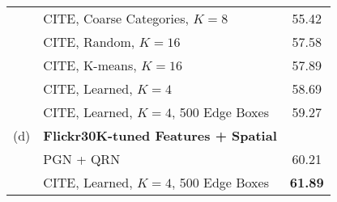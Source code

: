\documentclass[runningheads]{llncs}
\begin{document}
\begin{table}[t]
\begin{tabular}{|ll|c|}
      & CITE, Coarse Categories, $K=8$ & 55.42\\
      & CITE, Random, $K=16$ & 57.58\\
      & CITE, K-means, $K=16$ & 57.89\\
      & CITE, Learned, $K=4$ & 58.69\\
      & CITE, Learned, $K=4$, 500 Edge Boxes & 59.27\\
      \hline
      (d) & {\bf Flickr30K-tuned Features + Spatial} &\\
      & PGN + QRN~\cite{ChenICCV2017} & 60.21\\
      & CITE, Learned, $K=4$, 500 Edge Boxes & {\bf 61.89}\\
      \hline
    \end{tabular}
\end{table}
\end{document}
